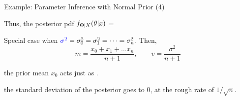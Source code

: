 \begin{frame}{Example: Parameter Inference with Normal Prior (4)}


  \plitemsep 0.03in
  \bci
  
\item<1-> Thus, the posterior pdf $\displaystyle f_{\Theta|X}(\theta|x)$ =
\item<3-> 

\item<4-> Special case when ${\color{blue} \sigma^2} = \sigma_0^2= \sigma_1^2=
  \cdots = \sigma_n^2.$ Then,  
  $$
  m = \frac{x_0 + x_1 + \ldots x_n}{n+1}, \qquad v = \frac{\sigma^2}{n+1}
  $$
  \bci
\item<5-> the prior mean $x_0$ acts just as .
\item<6-> the standard deviation of the posterior goes to 0, at the
  rough rate of $1/\sqrt{n}.$
  \eci

  \eci

\end{frame}

